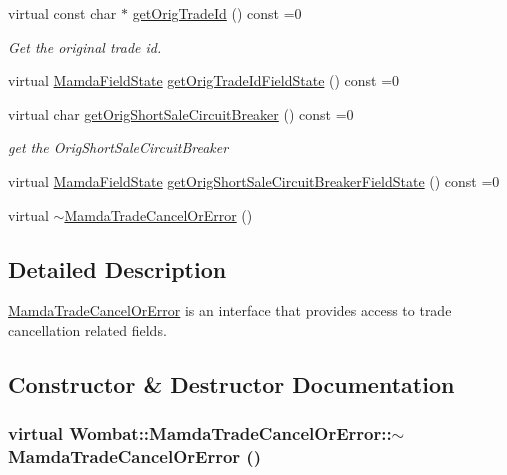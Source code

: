 \begin{CompactItemize}
\item 
virtual const char $\ast$ \hyperlink{classWombat_1_1MamdaTradeCancelOrError_77edcaedced6b03219438ef4b2bcef68}{get\-Orig\-Trade\-Id} () const =0
\begin{CompactList}\small\item\em Get the original trade id. \item\end{CompactList}\item 
virtual \hyperlink{namespaceWombat_93aac974f2ab713554fd12a1fa3b7d2a}{Mamda\-Field\-State} \hyperlink{classWombat_1_1MamdaTradeCancelOrError_ed7b73cb88b3c9813bbe7a79e1a25c87}{get\-Orig\-Trade\-Id\-Field\-State} () const =0
\item 
virtual char \hyperlink{classWombat_1_1MamdaTradeCancelOrError_54da84a40ec7c8cba6bc119c4fac7614}{get\-Orig\-Short\-Sale\-Circuit\-Breaker} () const =0
\begin{CompactList}\small\item\em get the Orig\-Short\-Sale\-Circuit\-Breaker \item\end{CompactList}\item 
virtual \hyperlink{namespaceWombat_93aac974f2ab713554fd12a1fa3b7d2a}{Mamda\-Field\-State} \hyperlink{classWombat_1_1MamdaTradeCancelOrError_5d43acfae05347c26f47fab7f0fcdd95}{get\-Orig\-Short\-Sale\-Circuit\-Breaker\-Field\-State} () const =0
\item 
virtual \hyperlink{classWombat_1_1MamdaTradeCancelOrError_c757fae5b09ac2af4f9de14969cea565}{$\sim$Mamda\-Trade\-Cancel\-Or\-Error} ()
\end{CompactItemize}


\subsection{Detailed Description}
\hyperlink{classWombat_1_1MamdaTradeCancelOrError}{Mamda\-Trade\-Cancel\-Or\-Error} is an interface that provides access to trade cancellation related fields. 



\subsection{Constructor \& Destructor Documentation}
\hypertarget{classWombat_1_1MamdaTradeCancelOrError_c757fae5b09ac2af4f9de14969cea565}{
\subsubsection[$\sim$MamdaTradeCancelOrError]{\setlength{\rightskip}{0pt plus 5cm}virtual Wombat::Mamda\-Trade\-Cancel\-Or\-Error::$\sim$Mamda\-Trade\-Cancel\-Or\-Error ()}}
\label{classWombat_1_1MamdaTradeCancelOrError_c757fae5b09ac2af4f9de14969cea565}




